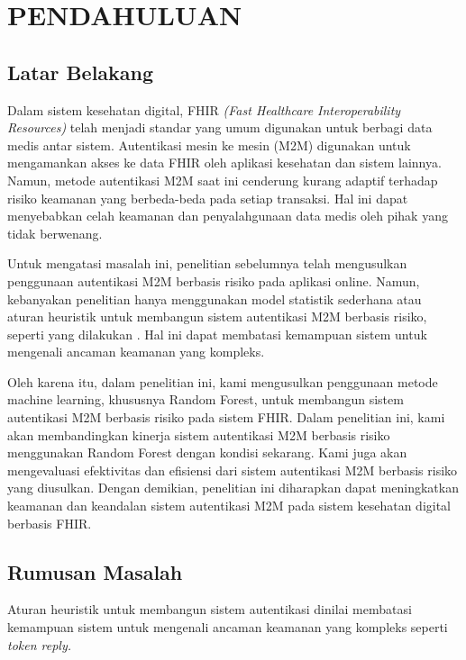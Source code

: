 \chapter{PENDAHULUAN}

\section{Latar Belakang}

Dalam sistem kesehatan digital, FHIR \textit{(Fast Healthcare Interoperability
Resources)} telah menjadi standar yang umum digunakan untuk berbagi data medis
antar sistem. Autentikasi mesin ke mesin (M2M) digunakan untuk mengamankan
akses ke data FHIR oleh aplikasi kesehatan dan sistem lainnya. Namun, metode
autentikasi M2M saat ini cenderung kurang adaptif terhadap risiko keamanan yang
berbeda-beda pada setiap transaksi. Hal ini dapat menyebabkan celah keamanan
dan penyalahgunaan data medis oleh pihak yang tidak berwenang.

Untuk mengatasi masalah ini, penelitian sebelumnya telah mengusulkan
penggunaan autentikasi M2M berbasis risiko pada aplikasi online. Namun,
kebanyakan penelitian hanya menggunakan model statistik sederhana atau aturan
heuristik untuk membangun sistem autentikasi M2M berbasis risiko, seperti yang
dilakukan \cite{steinegger_risk-based_2016}. 
Hal ini dapat membatasi kemampuan sistem untuk mengenali ancaman keamanan yang kompleks.

Oleh karena itu, dalam penelitian ini, kami mengusulkan penggunaan metode
machine learning, khususnya Random Forest, untuk membangun sistem autentikasi
M2M berbasis risiko pada sistem FHIR. Dalam penelitian ini, kami akan
membandingkan kinerja sistem autentikasi M2M berbasis risiko menggunakan
Random Forest dengan kondisi sekarang. Kami juga akan mengevaluasi efektivitas
dan efisiensi dari sistem autentikasi M2M berbasis risiko yang diusulkan. Dengan
demikian, penelitian ini diharapkan dapat meningkatkan keamanan dan keandalan
sistem autentikasi M2M pada sistem kesehatan digital berbasis FHIR.


\section{Rumusan Masalah}

Aturan heuristik untuk membangun sistem autentikasi dinilai membatasi
kemampuan sistem untuk mengenali ancaman keamanan yang kompleks seperti \textit{token reply.}


